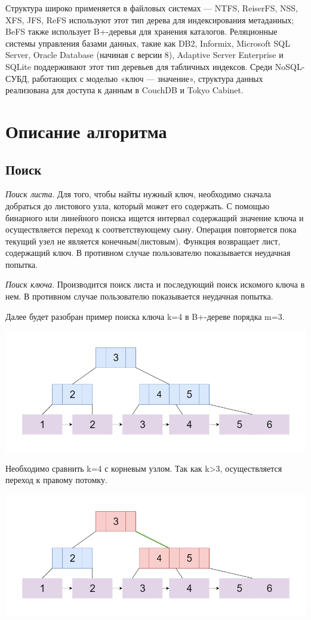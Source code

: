 \documentclass{article}
\begin{document}
Структура широко применяется в файловых системах — NTFS, ReiserFS, NSS, XFS, JFS, ReFS используют этот тип дерева для индексирования метаданных; BeFS также использует B+-деревья для хранения каталогов. Реляционные системы управления базами данных, такие как DB2, Informix, Microsoft SQL Server, Oracle Database (начиная с версии 8), Adaptive Server Enterprise и SQLite поддерживают этот тип деревьев для табличных индексов. Среди NoSQL-СУБД, работающих с моделью «ключ — значение», структура данных реализована для доступа к данным в CouchDB и Tokyo Cabinet.

\section{Описание алгоритма}

\subsection{Поиск}
\textit{Поиск листа}. Для того, чтобы найты нужный ключ, необходимо сначала добраться до листового узла, который может его содержать. С помощью бинарного или линейного поиска ищется интервал содержащий значение ключа и осуществляется переход к соответствующему сыну. Операция повторяется пока текущий узел не является конечным(листовым). Функция возвращает лист, содержащий ключ. В противном случае пользователю показывается неудачная попытка.

\textit{Поиск ключа}. Производится поиск листа и последующий поиск искомого ключа в нем. В противном случае пользователю показывается неудачная попытка.

Далее будет разобран пример поиска ключа k=4 в B+-дереве порядка m=3.

\includegraphics[scale=0.4]{bsearch.png}

Необходимо сравнить k=4 с корневым узлом. Так как k>3, осуществляется переход к правому потомку.

\includegraphics[scale=0.4]{bsearch2.png}
\end{document}
